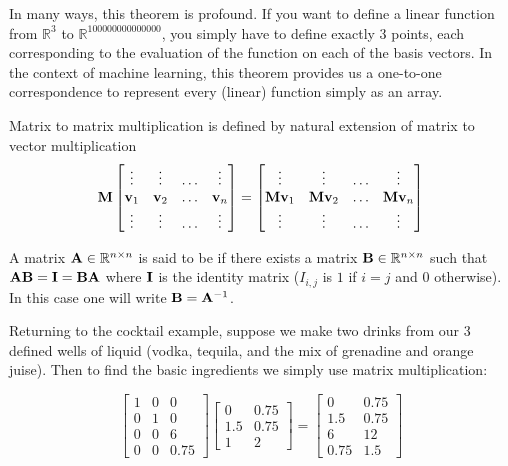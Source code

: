 In many ways, this theorem is profound. If you want to define a linear function from $\mathbb R^3$ to $\mathbb R^{100000000000000}$, you simply have to define exactly 3 points, each corresponding to the evaluation of the function on each of the basis vectors. In the context of machine learning, this theorem provides us a one-to-one correspondence to represent every (linear) function simply as an array. 

\begin{definition}
Matrix to matrix multiplication is defined by natural extension of matrix to vector multiplication
$$\MM \begin{bmatrix}
\vdots & \vdots & \ldots & \vdots \\
\vv_1 & \vv_2 & \ldots & \vv_n \\
\vdots & \vdots & \ldots & \vdots \\
\end{bmatrix} = \begin{bmatrix}
\vdots & \vdots & \ldots & \vdots \\
\MM \vv_1 & \MM \vv_2 & \ldots & \MM\vv_n \\
\vdots & \vdots & \ldots & \vdots \\
\end{bmatrix}$$
\end{definition}

A matrix $\MA\in\R^{n\times n}$ is said to be  if there exists a matrix $\MB\in\R^{n\times n}$ such that $\MA\MB = \MI = \MB\MA$ where $\MI$ is the identity matrix ($I_{i,j}$ is $1$ if $i=j$ and $0$ otherwise). In this case one will write $\MB = \MA^{-1}$.

\begin{example}
Returning to the cocktail example, suppose we make two drinks from our 3 defined wells of liquid (vodka, tequila, and the mix of grenadine and orange juise). Then to find the basic ingredients we simply use matrix multiplication: 

$$ \begin{bmatrix}
1 & 0 & 0 \\
0 & 1 & 0 \\
0 & 0 & 6 \\
0 & 0 & 0.75
\end{bmatrix}\begin{bmatrix}
0 & 0.75 \\
1.5 & 0.75 \\
1 & 2 
\end{bmatrix} = \begin{bmatrix}
0 & 0.75 \\
1.5 & 0.75 \\
6 & 12 \\
0.75 & 1.5
\end{bmatrix}$$
\end{example}

